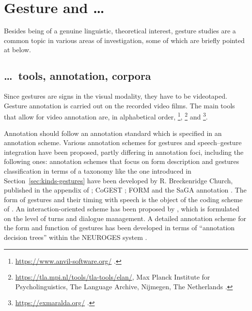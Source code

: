 \documentclass[output=paper
 	        ,biblatex
                ,babelshorthands
                ,newtxmath
                ,draftmode
                ,colorlinks, citecolor=brown
]{langscibook}
\begin{document}
\section{Gesture and \ldots}
\label{sec:gesture-and}

Besides being of a genuine linguistic, theoretical interest, gesture studies are a common topic in various areas of investigation, some of which are briefly pointed at below. 


\subsection{\ldots\ tools, annotation, corpora}
\label{sec:tools-annotation-corpora}

Since gestures are signs in the visual modality, they have to be videotaped.
%
Gesture annotation is carried out on the recorded video films.
%
The main tools that allow for video annotation are, in alphabetical order, \footnote{%
\url{https://www.anvil-software.org/} \citep{Kipp:2014}.
}, \footnote{%
\url{https://tla.mpi.nl/tools/tla-tools/elan/}, Max Planck Institute for Psycholinguistics, The
Language Archive, Nijmegen, The Netherlands \citep{Sloetjes:Wittenburg:2008}.}
and \footnote{%
\url{https://exmaralda.org/} \citep{Schmidt:2012}.
}.

Annotation should follow an annotation standard which is specified in an annotation scheme.
%
Various annotation schemes for gestures and speech--gesture integration have been proposed, partly differing in annotation foci, including the following ones:
%
annotation schemes that focus on form description and gestures classification in terms of a taxonomy like the one introduced in Section~\ref{sec:kinds-gestures} have been developed by R. Breckenridge Church, published in the appendix of \citet{McNeill:1992}; CoGEST \citep{Gibbon:et:al:2003}; FORM \citep{Martell:Osborn:Friedman:Howard:2002} and the SaGA annotation \citep{Luecking:Bergmann:Hahn:Kopp:Rieser:2013}.
%
The form of gestures and their timing with speech is the object of the coding scheme of \citet{Kipp:Neff:Albrecht:2007}.
%
An interaction-oriented scheme has been proposed by \citet{Allwood:et:al:2007}, which is formulated on the level of turns and dialogue management.
%
A detailed annotation scheme for the form and function of gestures has been developed in terms of \enquote{annotation decision trees} within the NEUROGES system \citep{Lausberg:Sloetjes:2009}.
\end{document}
